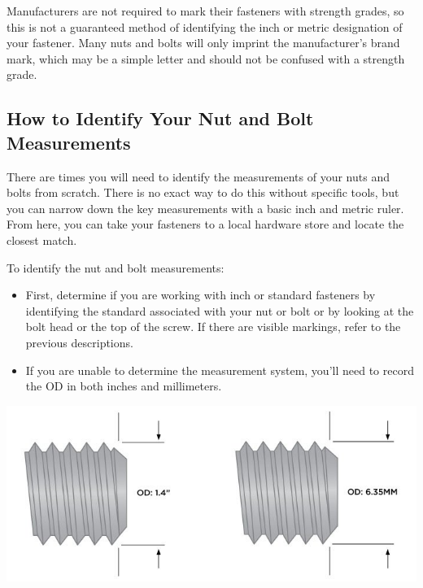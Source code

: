 \documentclass[english,]{article}
\providecommand{\tightlist}{%
  \setlength{\itemsep}{0pt}\setlength{\parskip}{0pt}}
\begin{document}
\hypertarget{i2x1zy}{}

\hypertarget{ite14y}{}
Manufacturers are not required to mark their fasteners with strength
grades, so this is not a guaranteed method of identifying the inch or
metric designation of your fastener. Many nuts and bolts will only
imprint the manufacturer's brand mark, which may be a simple letter and
should not be confused with a strength grade.

\hypertarget{i72lz7}{%
\subsection{How to Identify Your Nut and Bolt
Measurements}\label{i72lz7}}

\hypertarget{iw4hn7}{}
There are times you will need to identify the measurements of your nuts
and bolts from scratch. There is no exact way to do this without
specific tools, but you can narrow down the key measurements with a
basic inch and metric ruler. From here, you can take your fasteners to a
local hardware store and locate the closest match.

\hypertarget{ilxb3s}{}
To identify the nut and bolt measurements:

\begin{itemize}
\tightlist
\item
  First, determine if you are working with inch or standard fasteners by
  identifying the standard associated with your nut or bolt or by
  looking at the bolt head or the top of the screw. If there are visible
  markings, refer to the previous descriptions.
\item
  If you are unable to determine the measurement system, you'll need to
  record the OD in both inches and millimeters.
\end{itemize}

\includegraphics{Introduction to Nut and Bolt Sizes_files/6307ba3bb06ad783039359.jpg}
\end{document}
